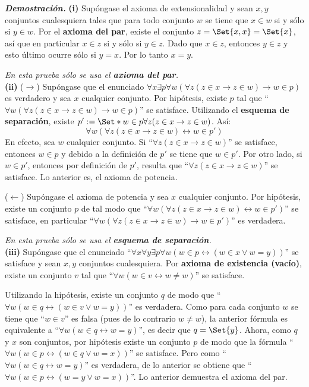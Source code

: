 \documentclass[12pt]{article}
\providecommand\given{}
\newcounter{A}
\begin{document}
    \textbf{\textit{Demostración.}} \textbf{(i)} Supóngase el axioma de extensionalidad y sean \(x,y\) conjuntos cualesquiera tales que para todo conjunto \(w\) se tiene que \(x \in w\) si y sólo si \(y \in w\). Por el \textbf{axioma del par}, existe el conjunto $z=\Set{x,x}=\Set{x}$, así que en particular $x \in z$ si y sólo si $y \in z$. Dado que $x \in z$, entonces $y \in z$ y esto último ocurre sólo si $y=x$. Por lo tanto $x=y$.
    
    \hfill \textit{En esta prueba sólo se usa el \textbf{axioma del par}.} \\

    \textbf{(ii)} (\(\rightarrow\)) Supóngase que el enunciado \(\forall x \exists p \forall w ( \forall z ( z \in x \to z \in w) \rightarrow w \in p )\) es verdadero y sea \(x\) cualquier conjunto. Por hipótesis, existe \(p\) tal que ``\(\forall w ( \forall z ( z \in x \to z \in w) \rightarrow w \in p )\)'' se satisface. Utilizando el \textbf{esquema de separación}, existe  \(p':=\Set*{ w \in p \given \forall z ( z \in x \to z \in w) } \). Así:
    \[ \forall w ( \forall z ( z \in x \to z \in w) \leftrightarrow w \in p' ) \]
    En efecto, sea \(w\) cualquier conjunto. Si ``\(\forall z ( z \in x \to z \in w)\)'' se satisface, entonces \(w \in p\) y debido a la definición de \(p'\) se tiene que \(w \in p'\). Por otro lado, si \(w \in p'\), entonces por definición de \(p'\), resulta que ``\(\forall z ( z \in x \to z \in w)\)'' se satisface. Lo anterior es, el axioma de potencia.

    (\(\leftarrow\)) Supóngase el axioma de potencia y sea \(x\) cualquier conjunto. Por hipótesis, existe un conjunto \(p\) de tal modo que ``\(\forall w ( \forall z ( z \in x \to z \in w) \leftrightarrow w \in p' )\)'' se satisface, en particular ``\(\forall w ( \forall z ( z \in x \to z \in w) \rightarrow w \in p' )\)'' es verdadera.

    \hfill \textit{En esta prueba sólo se usa el \textbf{esquema de separación}.} \\

    \textbf{(iii)} Supóngase que el enunciado ``\( \forall x \forall y \exists p \forall w ( w \in p \leftrightarrow (w \in x \lor w=y ) ) \)'' se satisface y sean \(x,y\) conjuntos cualesquiera. Por \textbf{axioma de existencia (vacío)}, existe un conjunto \(v\) tal que ``\(\forall w (w \in v \leftrightarrow w \neq w)\)'' se satisface.
    
    Utilizando la hipótesis, existe un conjunto \(q\) de modo que ``\(\forall w ( w \in q \leftrightarrow (w \in v \lor w=y ) )\)'' es verdadera. Como para cada conjunto \(w\) se tiene que ``\(w \in v\)'' es falsa (pues de lo contrario \(w \neq w\)), la anterior fórmula es equivalente a ``\(\forall w ( w \in q \leftrightarrow w=y )\)'', es decir que \(q=\Set{y}\). Ahora, como \(q\) y \(x\) son conjuntos, por hipótesis existe un conjunto \(p\) de modo que la fórmula ``\(\forall w ( w \in p \leftrightarrow (w \in q \lor w=x ) )\)'' se satisface. Pero como ``\(\forall w ( w \in q \leftrightarrow w=y )\)'' es verdadera, de lo anterior se obtiene que ``\(\forall w ( w \in p \leftrightarrow (w=y \lor w=x ) )\)''. Lo anterior demuestra el axioma del par.
\end{document}
